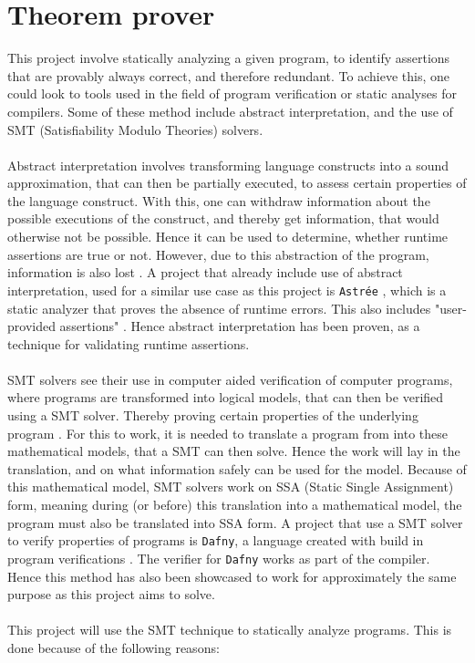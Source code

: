 
\section{Theorem prover } \label{sec:z3}
This project involve statically analyzing a given program, to identify assertions that are
provably always correct, and therefore redundant. To achieve this, one could look to tools used in
the field of program verification or static analyses for compilers.
Some of these method include abstract interpretation, and the use of SMT
(Satisfiability Modulo Theories) solvers.
\\
\\
Abstract interpretation involves transforming language constructs into a sound approximation,
that can then be partially executed, to assess certain properties of the language construct.
With this, one can withdraw information about the possible executions of the construct, and
thereby get information, that would otherwise not be possible. Hence it can be used to determine,
whether runtime assertions are true or not. However, due to this abstraction of the program,
information is also lost \cite{ai}. A project that already include use of abstract interpretation,
used for a similar use case as this project is \texttt{Astrée} \cite{astree}, which is a static
analyzer that proves the absence of runtime errors. This also includes "user-provided assertions"
\cite{astree}. Hence abstract interpretation has been proven, as a technique for validating
runtime assertions.
\\
\\
SMT solvers see their use in computer aided verification of computer programs, where programs
are transformed into logical models, that can then be verified using a SMT solver. Thereby proving
certain properties of the underlying program \cite{sigda}. For this to work, it is needed to
translate a program from \lan into these mathematical models, that a SMT can then solve. Hence
the work will lay in the translation, and on what information safely can be used for the model.
Because of this mathematical model, SMT solvers work on SSA (Static Single Assignment) form,
meaning during (or before) this translation into a mathematical model, the \lan program must also
be translated into SSA form. A project that use a SMT solver to verify properties of programs is
\texttt{Dafny}, a language created with build in program verifications \cite{dafny}. The verifier
for \texttt{Dafny} works as part of the compiler. Hence this method has also been showcased to work
for approximately the same purpose as this project aims to solve.
\\
\\
This project will use the SMT technique to statically analyze \lan programs. This is done because
of the following reasons:

